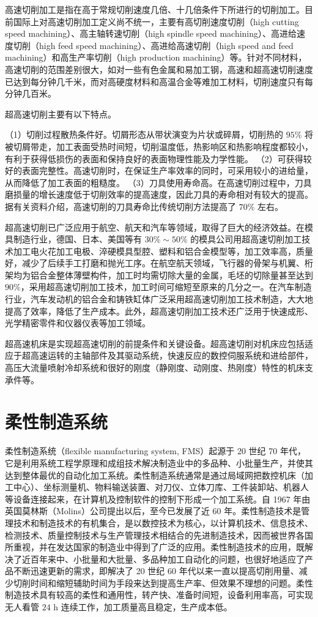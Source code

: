 \documentclass[UTF8]{ctexbook}
\newcommand{\◎}{\ensuremath{\bigcirc}}
\begin{document}
高速切削加工是指在高于常规切削速度几倍、十几倍条件下所进行的切削加工。目前国际上对高速切削加工定义尚不统一，主要有高切削速度切削（high cutting speed machining）、高主轴转速切削（high spindle speed machining）、高进给速度切削（high feed speed machining）、高进给高速切削（high speed and feed machining）和高生产率切削（high production machining）等。针对不同材料，高速切削的范围差别很大，如对一些有色金属和易加工钢，高速和超高速切削速度已达到每分钟几千米，而对高硬度材料和高温合金等难加工材料，切削速度只有每分钟几百米。

超高速切削主要有以下特点。

（1）切削过程散热条件好。切屑形态从带状演变为片状或碎屑，切削热的 $95\%$ 将被切屑带走，加工表面受热时间短，切削温度低，热影响区和热影响程度都较小，有利于获得低损伤的表面和保持良好的表面物理性能及力学性能。
（2）可获得较好的表面完整性。高速切削时，在保证生产率效率的同时，可采用较小的进给量，从而降低了加工表面的粗糙度。
（3）刀具使用寿命高。在高速切削过程中，刀具磨损量的增长速度低于切削效率的提高速度，因此刀具的寿命相对有较大的提高。据有关资料介绍，高速切削的刀具寿命比传统切削方法提高了 $70\%$ 左右。

超高速切削已广泛应用于航空、航天和汽车等领域，取得了巨大的经济效益。在模具制造行业，德国、日本、美国等有 $30\%\sim50\%$ 的模具公司用超高速切削加工技术加工电火花加工电极、淬硬模具型腔、塑料和铝合金模型等，加工效率高，质量好，减少了后续手工打磨和抛光工序。在航空航天领域，飞行器的骨架与机翼、桁架均为铝合金整体薄壁构件，加工时均需切除大量的金属，毛坯的切除量甚至达到 $90\%$，采用超高速切削加工技术，加工时间可缩短至原来的几分之一。在汽车制造行业，汽车发动机的铝合金和铸铁缸体广泛采用超高速切削加工技术制造，大大地提高了效率，降低了生产成本。此外，超高速切削加工技术还广泛用于快速成形、光学精密零件和仪器仪表等加工领域。

超高速机床是实现超高速切削的前提条件和关键设备。超高速切削对机床应包括适应于超高速运转的主轴部件及其驱动系统，快速反应的数控伺服系统和进给部件，高压大流量喷射冷却系统和很好的刚度（静刚度、动刚度、热刚度）特性的机床支承件等。

\section{柔性制造系统}

柔性制造系统（flexible manufacturing system, FMS）起源于 20 世纪 70 年代，它是利用系统工程学原理和成组技术解决制造业中的多品种、小批量生产，并使其达到整体最优的自动化加工系统。柔性制造系统通常是通过局域网把数控机床（加工中心）、坐标测量机、物料输送装置、对刀仪、立体刀库、工件装卸站、机器人等设备连接起来，在计算机及控制软件的控制下形成一个加工系统。自 1967 年由英国莫林斯（Molins）公司提出以后，至今已发展了近 60 年。柔性制造技术是管理技术和制造技术的有机集合，是以数控技术为核心，以计算机技术、信息技术、检测技术、质量控制技术与生产管理技术相结合的先进制造技术，因而被世界各国所重视，并在发达国家的制造业中得到了广泛的应用。柔性制造技术的应用，既解决了近百年来中、小批量和大批量、多品种加工自动化的问题，也很好地适应了产品不断迅速更新的需求，即解决了 20 世纪 60 年代以来一直以提高切削用量、减少切削时间和缩短辅助时间为手段来达到提高生产率、但效果不理想的问题。柔性制造技术具有较高的柔性和通用性，转产快、准备时间短，设备利用率高，可实现无人看管 $24\text{ h}$ 连续工作，加工质量高且稳定，生产成本低。
\end{document}
